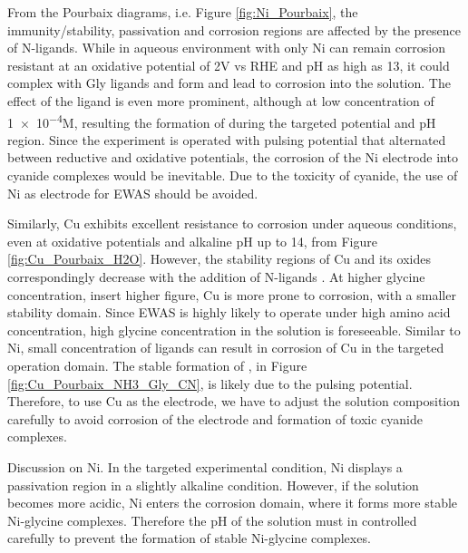 \documentclass[journal=jacsat,manuscript=article]{achemso}
\begin{document}
From the Pourbaix diagrams, i.e. Figure \ref{fig:Ni_Pourbaix}, the immunity/stability, passivation and corrosion regions are affected by the presence of N-ligands. While in aqueous environment with only  Ni can remain corrosion resistant at an oxidative potential of 2V vs RHE and pH as high as 13, it could complex with Gly ligands and form \ce{[Ni(Gly)3^-]} and lead to corrosion into the solution. The effect of the  ligand is even more prominent, although at low concentration of \num{1e-4}M, resulting the formation \ce{[Ni(CN)4^2-]} of during the targeted potential and pH region. Since the experiment is operated with pulsing potential that alternated between reductive and oxidative potentials, the corrosion of the Ni electrode into cyanide complexes would be inevitable. Due to the toxicity of cyanide\cite{Bhattacharya2009CyanideTreatment}, the use of Ni as electrode for EWAS should be avoided. 

Similarly, Cu exhibits excellent resistance to corrosion under aqueous conditions, even at oxidative potentials and alkaline pH up to 14, from Figure \ref{fig:Cu_Pourbaix_H2O}. However, the stability regions of Cu and its oxides correspondingly decrease with the addition of N-ligands\cite{Wang2022ThermodynamicDiagrams}
. At higher glycine concentration, insert higher figure, Cu is more prone to corrosion, with a smaller stability domain. Since EWAS is highly likely to operate under high amino acid concentration, high glycine concentration in the solution is foreseeable. Similar to Ni, small concentration of  ligands can result in corrosion of Cu in the targeted operation domain. The stable formation of , in Figure \ref{fig:Cu_Pourbaix_NH3_Gly_CN}, is likely due to the pulsing potential. Therefore, to use Cu as the electrode, we have to adjust the solution composition carefully to avoid corrosion of the electrode and formation of toxic cyanide complexes. 


Discussion on Ni. In the targeted experimental condition, Ni displays a passivation region in a slightly alkaline condition. However, if the solution becomes more acidic, Ni enters the corrosion domain, where it forms more stable Ni-glycine complexes. Therefore the pH of the solution must in controlled carefully to prevent the formation of stable Ni-glycine complexes. 
\end{document}
